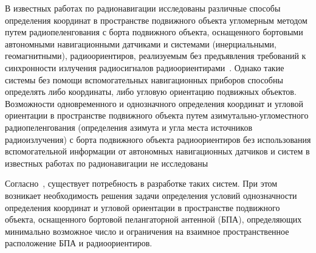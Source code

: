 \documentclass[../main.tex]{subfiles}
\begin{document}
В известных работах по радионавигации исследованы различные способы определения координат в пространстве подвижного объекта угломерным методом путем радиопеленгования с борта подвижного объекта, оснащенного бортовыми автономными навигационными датчиками и системами (инерциальными, геомагнитными), радиоориентиров, реализуемым без предъявления требований к синхронности излучения радиосигналов радиоориентирами~\cite{BBELAVIN:1977}. Однако такие системы без помощи вспомогательных навигационных приборов способны определять либо координаты, либо угловую ориентацию подвижных объектов. Возможности одновременного и однозначного определения координат и угловой ориентации в пространстве подвижного объекта путем азимутально-угломестного радиопеленгования (определения азимута и угла места источников радиоизлучения) с борта подвижного объекта радиоориентиров без использования вспомогательной информации от автономных навигационных датчиков и систем в известных работах по радионавигации не исследованы~\cite{VINOGRADOV:2016}

Согласно~\cite{REPORT:2015}, существует потребность в разработке таких систем. При этом возникает необходимость решения задачи определения условий однозначности определения координат и угловой ориентации в пространстве подвижного объекта, оснащенного бортовой пелангаторной антенной (БПА), определяющих минимально возможное число и ограничения на взаимное пространственное расположение БПА и радиоориентиров.
\end{document}
